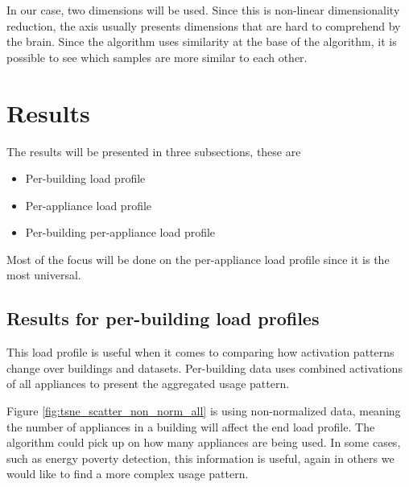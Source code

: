 In our case, two dimensions will be used. Since this is non-linear dimensionality reduction,
the axis usually presents dimensions that are hard to comprehend by the brain. 
Since the algorithm uses similarity at the base of the algorithm, it is possible to 
see which samples are more similar to each other.


\section{Results}

The results will be presented in three subsections, these are

\begin{itemize}
	\item Per-building load profile
	\item Per-appliance load profile
	\item Per-building per-appliance load profile
\end{itemize}

Most of the focus will be done on the per-appliance load profile since it is the most universal.

\subsection{Results for per-building load profiles}
\label{ssec:res_pb_lp}
This load profile is useful when it comes to comparing how 
activation patterns change over buildings and datasets.
Per-building data uses combined activations of all appliances to present 
the aggregated usage pattern. 

Figure \ref{fig:tsne_scatter_non_norm_all} is using non-normalized data, meaning
the number of appliances in a building will affect the end load profile.
The algorithm could pick up on how many appliances are being used.
In some cases, such as energy poverty detection, this information is useful, 
again in others we would like to find a more complex usage pattern.

